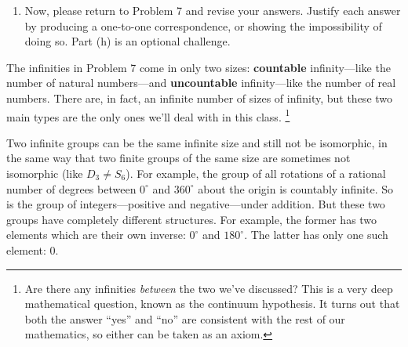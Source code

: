 \documentclass[../gatm.tex]{subfiles}
\begin{document}
\begin{enumerate}
\setcounter{enumi}{\value{inf_problem_i}}
\item Now, please return to Problem 7 and revise your answers. Justify each answer by producing a one-to-one correspondence, or showing the impossibility of doing so. Part (h) is an optional challenge.
\setcounter{inf_problem_i}{\value{enumi}}
\end{enumerate}

The infinities in Problem 7 come in only two sizes: \textbf{countable} infinity---like the number of natural numbers---and \textbf{uncountable} infinity---like the number of real numbers. There are, in fact, an infinite number of sizes of infinity, but these two main types are the only ones we'll deal with in this class. \footnote{Are there any infinities \textit{between} the two we’ve discussed? This is a very deep mathematical question, known as the continuum hypothesis. It turns out that both the answer ``yes'' and ``no'' are consistent with the rest of our mathematics, so either can be taken as an axiom.}

Two infinite groups can be the same infinite size and still not be isomorphic, in the same way that two finite groups of the same size are sometimes not isomorphic (like $D_3\neq S_6$). For example, the group of all rotations of a rational number of degrees between $0^\circ$ and $360^\circ$ about the origin is countably infinite. So is the group of integers---positive and negative---under addition. But these two groups have completely different structures. For example, the former has two elements which are their own inverse: $0^\circ$ and $180^\circ$. The latter has only one such element: $0$.
\end{document}
